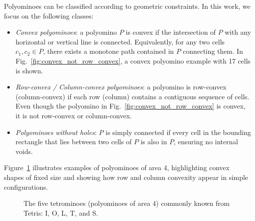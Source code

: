 \documentclass{article}
\theoremstyle{definition}
\theoremstyle{plain}
\begin{document}
Polyominoes can be classified according to geometric constraints. In this 
work, we focus on the following classes:

\begin{itemize}
    \item \emph{Convex polyominoes}: a polyomino $P$ is convex if the 
    intersection of $P$ with any horizontal or vertical line is connected. 
    Equivalently, for any two cells $c_1, c_2 \in P$, there exists a 
    monotone path contained in $P$ connecting them. In 
    Fig.~\ref{fig:convex_not_row_convex}, a convex polyomino example with 
    17 cells is shown.
    \item \emph{Row-convex / Column-convex polyominoes}: a polyomino is 
    row-convex (column-convex) if each row (column) contains a contiguous 
    sequence of cells. Even though the polyomino in 
    Fig.~\ref{fig:convex_not_row_convex} is convex, it is not row-convex 
    or column-convex.
    \item \emph{Polyominoes without holes}: $P$ is simply connected if 
    every cell in the bounding rectangle that lies between two cells of $P$ 
    is also in $P$, ensuring no internal voids.
\end{itemize}

Figure~\ref{fig:tetrominoes} illustrates examples of polyominoes of area 
4, highlighting convex shapes of fixed size and showing how row and column 
convexity appear in simple configurations.

\begin{figure}[H]
\centering
{}
\caption{The five tetrominoes (polyominoes of area 4) commonly known from 
Tetris: I, O, L, T, and S.}
\label{fig:tetrominoes}
\end{figure}
\end{document}
